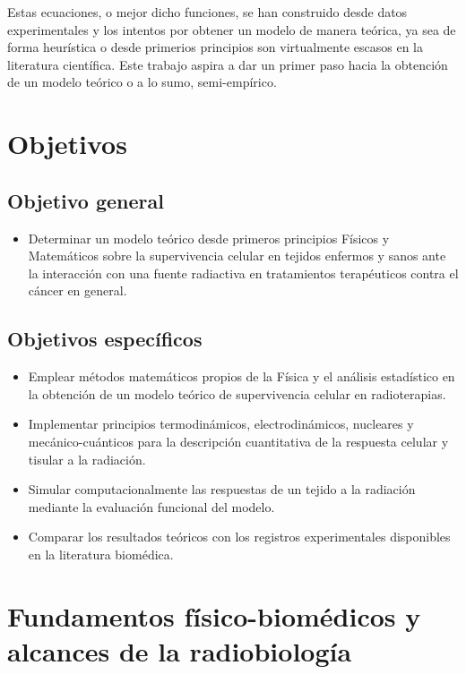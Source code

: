 \documentclass[12pt,letterpaper, oneside]{book}
\begin{document}
	Estas ecuaciones, o mejor dicho funciones, se han construido desde datos experimentales y los intentos por obtener un modelo de manera teórica, ya sea de forma heurística o desde primerios principios son virtualmente escasos en la literatura científica. Este trabajo aspira a dar un primer paso hacia la obtención de un modelo teórico o a lo sumo, semi-empírico. 
	
	\chapter*{Objetivos}
	
	\section*{Objetivo general}
	\begin{itemize}
		\item Determinar un modelo teórico desde primeros principios Físicos y Matemáticos sobre la supervivencia celular en tejidos enfermos y sanos ante la interacción con una fuente radiactiva en tratamientos terapéuticos contra el cáncer en general.
	\end{itemize}
	\section*{Objetivos específicos}
	\begin{itemize}
		\item Emplear métodos matemáticos propios de la Física y el análisis estadístico en la obtención de un modelo teórico de supervivencia celular en radioterapias. 
		\item Implementar principios termodinámicos, electrodinámicos, nucleares y mecánico-cuánticos para la descripción cuantitativa de la respuesta celular y tisular a la radiación. 
		\item Simular computacionalmente las respuestas de un tejido a la radiación mediante la evaluación funcional del modelo. 
		\item Comparar los resultados teóricos con los registros experimentales disponibles en la literatura biomédica. 
	\end{itemize}
	
	\chapter{Fundamentos físico-biomédicos y alcances de la radiobiología}\label{fundamentos_fisico_biomedicos}
\end{document}
